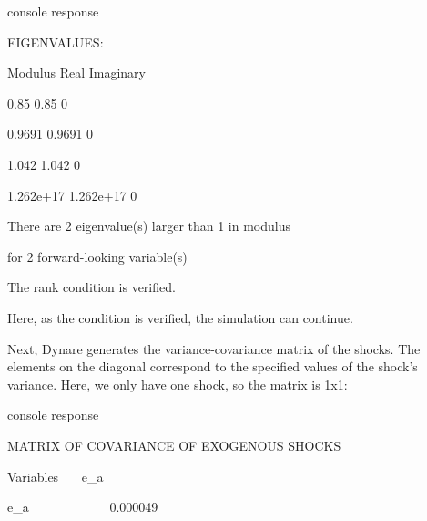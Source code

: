 \documentclass[a4paper,12pt]{article}%
\begin{document}
\vspace{3ex}
\begin{myresult}{console response}%


\textsf{EIGENVALUES:}

\textsf{ Modulus Real Imaginary}

\textsf{ 0.85 0.85 0}

\textsf{ 0.9691 0.9691 0}

\textsf{ 1.042 1.042 0}

\textsf{ 1.262e+17 1.262e+17 0}

\textsf{%
\vspace{6ex}%
}

\textsf{There are 2 eigenvalue(s) larger than 1 in modulus }

\textsf{for 2 forward-looking variable(s)}

\textsf{%
\vspace{3ex}%
}

\textsf{The rank condition is verified.}%

\end{myresult}
\vspace{3ex}%


Here, as the condition is verified, the simulation can continue.

Next, Dynare generates the variance-covariance matrix of the shocks. The
elements on the diagonal correspond to the specified values of the shock's
variance. Here, we only have one shock, so the matrix is 1x1:%

\vspace{3ex}
\begin{myresult}{console response}%


\textsf{MATRIX OF COVARIANCE OF EXOGENOUS SHOCKS}

\textsf{%
\vspace{3ex}%
}

\textsf{Variables \ \ \ e\_a}

\textsf{e\_a \ \ \ \ \ \ \ \ \ \ \ \ 0.000049}%

\end{myresult}
\vspace{3ex}%
\end{document}
